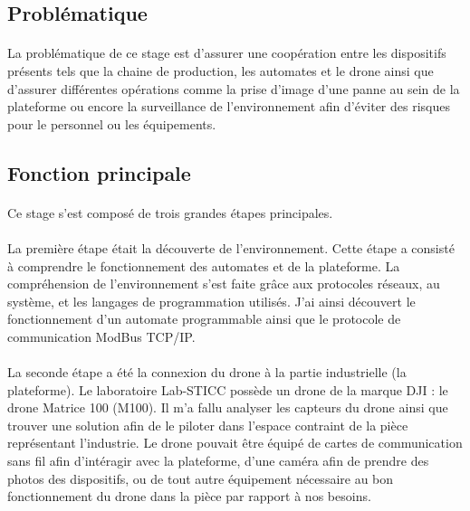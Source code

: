 		\subsection{Problématique}
		    \paragraph*{}
		    La problématique de ce stage est d'assurer une coopération entre les dispositifs présents tels que la chaine de production, les automates et le drone ainsi que d'assurer différentes opérations comme la prise d'image d'une panne au sein de la plateforme ou encore la surveillance de l'environnement afin d'éviter des risques pour le personnel ou les équipements.
		
        \subsection{Fonction principale}
            \paragraph*{}
            Ce stage s'est composé de trois grandes étapes principales.
            
            \paragraph*{}
            La première étape était la découverte de l'environnement. Cette étape a consisté à comprendre le fonctionnement des automates et de la plateforme. La compréhension de l'environnement s'est faite grâce aux protocoles réseaux, au système, et les langages de programmation utilisés. J'ai ainsi découvert le fonctionnement d'un automate programmable ainsi que le protocole de communication ModBus TCP/IP.
            
            \paragraph*{}
            La seconde étape a été la connexion du drone à la partie industrielle (la plateforme). Le laboratoire Lab-STICC possède un drone de la marque DJI : le drone Matrice 100 (M100)\cite{djiMat100}. Il m'a fallu analyser les capteurs du drone ainsi que trouver une solution afin de le piloter dans l'espace contraint de la pièce représentant l'industrie. Le drone pouvait être équipé de cartes de communication sans fil afin d'intéragir avec la plateforme, d'une caméra afin de prendre des photos des dispositifs, ou de tout autre équipement nécessaire au bon fonctionnement du drone dans la pièce par rapport à nos besoins.
            
